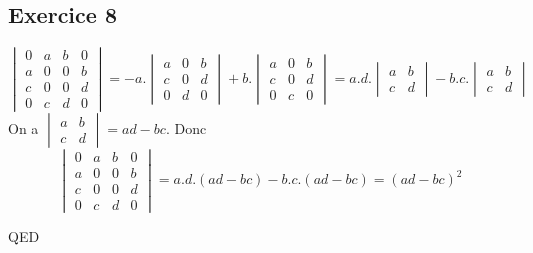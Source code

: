 \documentclass[]{book}
\theoremstyle{definition}
\begin{document}
\subsection*{Exercice 8}
$$
\begin{vmatrix} 0 & a & b & 0\\ a & 0 & 0 & b\\ c & 0 & 0 & d\\ 0 & c & d & 0\end{vmatrix} =
-a.\begin{vmatrix} a & 0 & b\\ c & 0 & d\\ 0 & d & 0\end{vmatrix} + b.\begin{vmatrix} a & 0 & b\\ c & 0 & d\\ 0 & c & 0\end{vmatrix} =
a.d.\begin{vmatrix} a & b\\ c & d\end{vmatrix} - b.c.\begin{vmatrix} a & b\\ c & d\end{vmatrix}
$$
On a $\begin{vmatrix} a & b\\ c & d\end{vmatrix} = ad-bc$. Donc 
$$
\begin{vmatrix} 0 & a & b & 0\\ a & 0 & 0 & b\\ c & 0 & 0 & d\\ 0 & c & d & 0\end{vmatrix} = a.d.(ad-bc) - b.c.(ad-bc) = (ad-bc)^2
$$ 

QED
\end{document}
